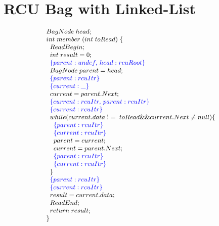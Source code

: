 \makeatletter
\makeatother
\section{RCU Bag with Linked-List}
\label{appendix:bag_paul}
\[\small
\begin{array}{@{}l@{}}
  BagNode\; head;\\
  int \;member\;(int\;toRead)\;\{\\
   \;\;ReadBegin; \\
   \;\;int\;result =0; \\
   \;\;\specline{parent:undef,\, head:rcuRoot}\\
   \;\;BagNode \;parent = head; \\
   \;\;\specline{parent:rcuItr}\\
\;\;\specline{current:\_}\\
   \;\;current = parent.Next; \\
   \;\;\specline{current:rcuItr,\, parent:rcuItr}\\
      \;\;\specline{current:rcuItr}\\
   \;\;while(current.data\; != \;toRead \&\& current.Next \neq null)\{\\
     \;\;\;\;\specline{parent:rcuItr}\\
      \;\;\;\;\specline{current:rcuItr}\\
     \;\;\;\;parent= current;\\
     \;\;\;\;current = parent.Next ;\\
  \;\;\;\;\specline{parent:rcuItr}\\
      \;\;\;\;\specline{current:rcuItr}\\
     \;\;\}\\
   \;\;\specline{parent:rcuItr}\\
   \;\;\specline{current:rcuItr}\\
   \;\;result = current.data;\\
   \;\;ReadEnd;\\
   \;\;return \; result;\\
  \}\\
\end{array}
\]
